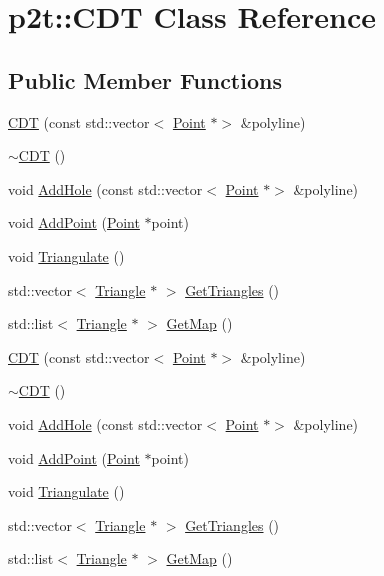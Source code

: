 \hypertarget{classp2t_1_1CDT}{}\section{p2t\+:\+:C\+DT Class Reference}
\label{classp2t_1_1CDT}
\subsection*{Public Member Functions}
\begin{DoxyCompactItemize}
\item 
\hyperlink{classp2t_1_1CDT_a985f59dc7a62e2ca567f23b663713fe5}{C\+DT} (const std\+::vector$<$ \hyperlink{structp2t_1_1Point}{Point} $\ast$$>$ \&polyline)
\item 
\hyperlink{classp2t_1_1CDT_af1b16e2c9ad6d145f953ddbe721c7cb4}{$\sim$\+C\+DT} ()
\item 
void \hyperlink{classp2t_1_1CDT_abb1e1cdbfefa8053421c1bb6ac49c909}{Add\+Hole} (const std\+::vector$<$ \hyperlink{structp2t_1_1Point}{Point} $\ast$$>$ \&polyline)
\item 
void \hyperlink{classp2t_1_1CDT_acf36ab360e46f084c7df31acc7d845c1}{Add\+Point} (\hyperlink{structp2t_1_1Point}{Point} $\ast$point)
\item 
void \hyperlink{classp2t_1_1CDT_a6ba702d81df16da88e3ae80705d7d276}{Triangulate} ()
\item 
std\+::vector$<$ \hyperlink{classp2t_1_1Triangle}{Triangle} $\ast$ $>$ \hyperlink{classp2t_1_1CDT_ac7f372972e6b94d678323d1a3378b443}{Get\+Triangles} ()
\item 
std\+::list$<$ \hyperlink{classp2t_1_1Triangle}{Triangle} $\ast$ $>$ \hyperlink{classp2t_1_1CDT_a4491cea3f797ec485f34dd3c7d62050f}{Get\+Map} ()
\item 
\hyperlink{classp2t_1_1CDT_a985f59dc7a62e2ca567f23b663713fe5}{C\+DT} (const std\+::vector$<$ \hyperlink{structp2t_1_1Point}{Point} $\ast$$>$ \&polyline)
\item 
\hyperlink{classp2t_1_1CDT_af1b16e2c9ad6d145f953ddbe721c7cb4}{$\sim$\+C\+DT} ()
\item 
void \hyperlink{classp2t_1_1CDT_abb1e1cdbfefa8053421c1bb6ac49c909}{Add\+Hole} (const std\+::vector$<$ \hyperlink{structp2t_1_1Point}{Point} $\ast$$>$ \&polyline)
\item 
void \hyperlink{classp2t_1_1CDT_acf36ab360e46f084c7df31acc7d845c1}{Add\+Point} (\hyperlink{structp2t_1_1Point}{Point} $\ast$point)
\item 
void \hyperlink{classp2t_1_1CDT_a6ba702d81df16da88e3ae80705d7d276}{Triangulate} ()
\item 
std\+::vector$<$ \hyperlink{classp2t_1_1Triangle}{Triangle} $\ast$ $>$ \hyperlink{classp2t_1_1CDT_a7b1cf94ed4277a0dfc901cba7b46a0e2}{Get\+Triangles} ()
\item 
std\+::list$<$ \hyperlink{classp2t_1_1Triangle}{Triangle} $\ast$ $>$ \hyperlink{classp2t_1_1CDT_a21d26326ba731670dc48ac1897e6f181}{Get\+Map} ()
\end{DoxyCompactItemize}


